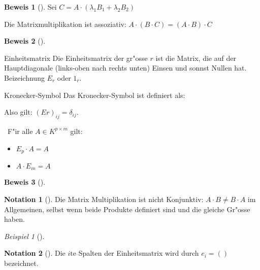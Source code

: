 \documentclass[11pt]{article}
\theoremstyle{remark}
\newtheorem{exa}{Beispiel}[section]
\theoremstyle{definition}
\newtheorem{prof}{Beweis}
\newtheorem*{notation}{Notation}
\theoremstyle{remark}
\begin{document}
\begin{prof}[] \label{}
Sei \(C=A\cdot (\lambda_1 B_1 + \lambda_2 B_2)\)
\end{prof}

\begin{relation}
Die Matrixmultiplikation ist assoziativ: \(A\cdot (B\cdot C)=(A\cdot B)\cdot C\)
\end{relation}

\begin{prof}[] \label{}

\end{prof}

\begin{definition}{Einheitsmatrix}{}
Die Einheitsmatrix der gr"osse \(r\) ist die Matrix, die auf der Hauptdiagonale
(links-oben nach rechts unten) Einsen und sonnst Nullen hat. Beizeichnung \(E_r\)
oder \(1_r\).
\end{definition}

\begin{definition}{Kronecker-Symbol}{}
Das Kronecker-Symbol ist definiert als: 

Also gilt: \((Er)_{ij}=\delta_{ij}\).
\end{definition}

\begin{theo}{}{} \
F"ir alle \(A\in K^{p\times m}\) gilt:
\begin{itemize}
\item \(E_p\cdot A=A\)
\item \(A\cdot E_m =A\)
\end{itemize}
\end{theo}

\begin{prof}[] \label{}

\end{prof}


\begin{notation}[] \label{Vorsicht!}
Die Matrix Multiplikation ist nicht Konjunktiv: \(A\cdot B\not= B\cdot A\) im
Allgemeinen, selbst wenn beide Produkte definiert sind und die gleiche Gr"osse
haben.
\end{notation}

\begin{exa}[] \label{}

\end{exa}

\begin{notation}[] \label{}
Die \(i\text{te}\) Spalten der Einheitsmatrix wird durch \(e_i=()\) bezeichnet.
\end{notation}
\end{document}
